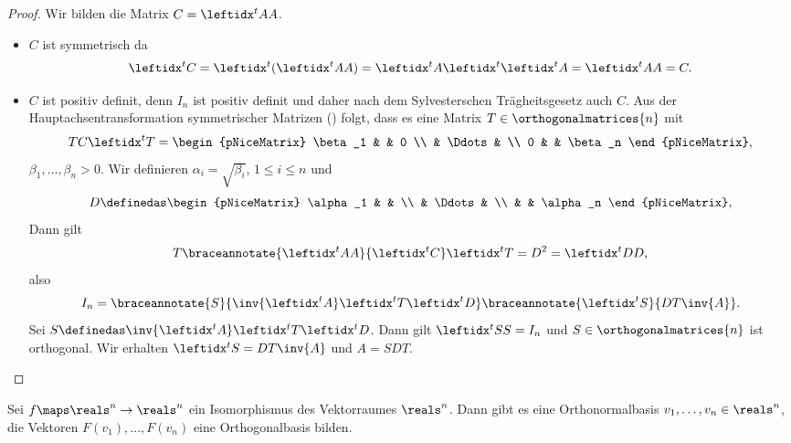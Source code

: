 \begin{proof}
  Wir bilden die Matrix \( C=\transpose{A}A \).
  \begin{itemize}
    \item \( C \) ist symmetrisch da
    \begin{equation*}
      \transpose{C}=\transpose{(\transpose{A}A)}=\transpose{A}\transpose{\transpose{A}}=\transpose{A}A=C.
    \end{equation*}
    \item \( C \) ist positiv definit, denn \( I_n \) ist positiv definit und daher nach dem Sylvesterschen Trägheitsgesetz auch \( C \). Aus der Hauptachsentransformation symmetrischer Matrizen () folgt, dass es eine Matrix \( T\in \orthogonalmatrices{n} \) mit
    \begin{equation*}
      TC\transpose{T}=\begin{pNiceMatrix}
        \beta_1 &  & 0 \\
         & \Ddots &  \\
        0 &  & \beta_n
      \end{pNiceMatrix},
    \end{equation*}
    \( \beta_1,\dotsc,\beta_n>0 \). Wir definieren \( \alpha_i=\sqrt{\beta_i} \), \( 1\leq i\leq n \) und 
    \begin{equation*}
      D\definedas \begin{pNiceMatrix} \alpha_1 &  &  \\  & \Ddots &  \\  &  & \alpha_n \end{pNiceMatrix},
    \end{equation*}
    Dann gilt
    \begin{equation*}
      T\braceannotate{\transpose{A}A}{\transpose{C}}\transpose{T}=D^2=\transpose{D}D,
    \end{equation*}
    also
    \begin{equation*}
      I_n=\braceannotate{S}{\inv{\transpose{A}}\transpose{T}\transpose{D}}\braceannotate{\transpose{S}}{DT\inv{A}}.
    \end{equation*}
    Sei \( S\definedas \inv{\transpose{A}}\transpose{T}\transpose{D} \). Dann gilt \( \transpose{S}S=I_n \) und \( S\in \orthogonalmatrices{n} \) ist orthogonal. Wir erhalten \( \transpose{S}=DT\inv{A} \) und \( A=SDT \).
  \end{itemize}
\end{proof}
\begin{korollar*}
  Sei \( f\maps \reals^n\to \reals^n \) ein Isomorphismus des Vektorraumes \( \reals^n \). Dann gibt es eine Orthonormalbasis \( v_1,\dotsc, v_n\in \reals^n \), \sd die Vektoren \( F(v_1),\dotsc,F(v_n) \) eine Orthogonalbasis bilden.
\end{korollar*}
